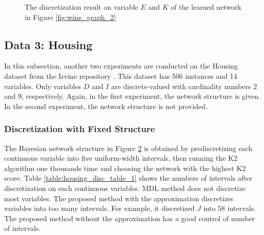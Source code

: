 \begin{figure}[ht]
  \centering
  \begin{tabular}{cc}
    
 \end{tabular}
  \caption{The discretization result on variable $E$ and $K$ of the learned network in Figure \ref{fig:wine_graph_2}
  }
  \label{fig:wine_exp2_distr}
\end{figure}

\subsection{Data 3: Housing}
\label{subsec:housing}

In this subsection, another two experiments are conducted on the Housing dataset from the Irvine repository \citep{Lichman_2013}. This dataset has 506 instances and 14 variables. Only variables $D$ and $I$ are discrete-valued with cardinality numbers 2 and 9, respectively. Again, in the first experiment, the network structure is given. In the second experiment, the network structure is not provided.

\subsubsection{Discretization with Fixed Structure}
\label{subsubsec:housing_exp1}

The Bayesian network structure in Figure \ref{fig:housing_graph_1} is obtained by prediscretizing each continuous variable into five uniform-width intervals, then running the K2 algorithm one thousands time and choosing the network with the highest K2 score. Table \ref{table:housing_disc_table_1} shows the numbers of intervals after discretization on each continuous variables. MDL method does not discretize most variables. The proposed method with the approximation discretizes variables into too many intervals. For example, it discretized $J$ into 58 intervals. The proposed method without the approximation has a good control of number of intervals.
\begin{figure}[ht]
  \centering
  \begin{tabular}{cc}
   
   \end{tabular}
  \caption{}
  \label{fig:housing_graph_1}
\end{figure}


